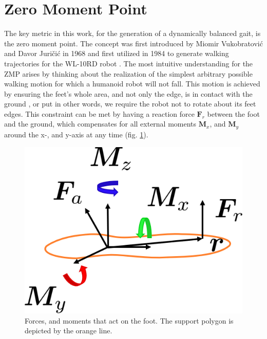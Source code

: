 \FloatBarrier
\section{Zero Moment Point}
\label{sec::21_zmp}
The key metric in this work, for the generation of a dynamically balanced gait, is the zero moment point. The concept was first introduced by Miomir Vukobratovi\'{c} and Davor Juri\v{c}i\'{c} in 1968 \cite{vukobratovic1968contribution}\cite{vukobratovic1969contribution} and first utilized in 1984 to generate walking trajectories for the WL-10RD robot \cite{yamaguchi1993development}. The most intuitive understanding for the ZMP arises by thinking about the realization of the simplest arbitrary possible walking motion for which a humanoid robot will not fall. This motion is achieved by ensuring the feet's whole area, and not only the edge, is in contact with the ground \cite{vukobratovic2004zero}, or put in other words, we require the robot not to rotate about its feet edges. This constraint can be met by having a reaction force $\bm{F}_r$ between the foot and the ground, which compensates for all external moments $\bm{M}_x$, and $\bm{M}_y$ around the x-, and y-axis at any time (fig. \ref{fig::21_zmp}).
\begin{figure}[h!]
	\centering
	\includegraphics[scale=.5]{chapters/02_foundations_for_humanoid_walking/img/zero_moment_point.png}
	\caption{Forces, and moments that act on the foot. The support polygon is depicted by the orange line.}
	\label{fig::21_zmp}
\end{figure}
